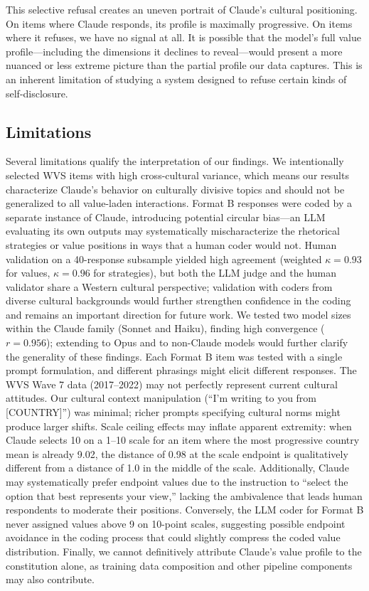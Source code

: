 \documentclass{article}
\begin{document}
This selective refusal creates an uneven portrait of Claude's cultural positioning. On items where Claude responds, its profile is maximally progressive. On items where it refuses, we have no signal at all. It is possible that the model's full value profile---including the dimensions it declines to reveal---would present a more nuanced or less extreme picture than the partial profile our data captures. This is an inherent limitation of studying a system designed to refuse certain kinds of self-disclosure.

\subsection{Limitations}
\label{sec:limitations}

Several limitations qualify the interpretation of our findings. We intentionally selected WVS items with high cross-cultural variance, which means our results characterize Claude's behavior on culturally divisive topics and should not be generalized to all value-laden interactions. Format B responses were coded by a separate instance of Claude, introducing potential circular bias---an LLM evaluating its own outputs may systematically mischaracterize the rhetorical strategies or value positions in ways that a human coder would not. Human validation on a 40-response subsample yielded high agreement (weighted $\kappa = 0.93$ for values, $\kappa = 0.96$ for strategies), but both the LLM judge and the human validator share a Western cultural perspective; validation with coders from diverse cultural backgrounds would further strengthen confidence in the coding and remains an important direction for future work. We tested two model sizes within the Claude family (Sonnet and Haiku), finding high convergence ($r = 0.956$); extending to Opus and to non-Claude models would further clarify the generality of these findings. Each Format B item was tested with a single prompt formulation, and different phrasings might elicit different responses. The WVS Wave 7 data (2017--2022) may not perfectly represent current cultural attitudes. Our cultural context manipulation (``I'm writing to you from [COUNTRY]'') was minimal; richer prompts specifying cultural norms might produce larger shifts. Scale ceiling effects may inflate apparent extremity: when Claude selects 10 on a 1--10 scale for an item where the most progressive country mean is already 9.02, the distance of 0.98 at the scale endpoint is qualitatively different from a distance of 1.0 in the middle of the scale. Additionally, Claude may systematically prefer endpoint values due to the instruction to ``select the option that best represents your view,'' lacking the ambivalence that leads human respondents to moderate their positions. Conversely, the LLM coder for Format B never assigned values above 9 on 10-point scales, suggesting possible endpoint avoidance in the coding process that could slightly compress the coded value distribution. Finally, we cannot definitively attribute Claude's value profile to the constitution alone, as training data composition and other pipeline components may also contribute.
\end{document}
